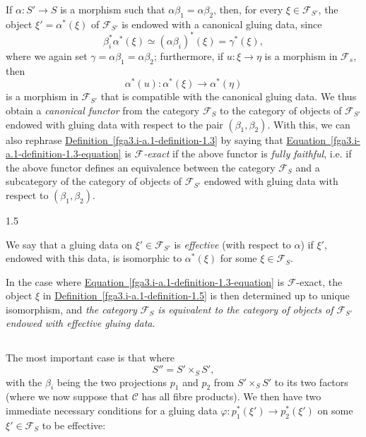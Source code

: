   If \(\alpha \colon  S'\to  S\) is a morphism such that \(\alpha \beta _1=\alpha \beta _2\), then, for every \(\xi \in \mathcal {F}_{S'}\), the object \(\xi '=\alpha ^*(\xi )\) of \(\mathcal {F}_{S'}\) is endowed with a canonical gluing data, since
  \[     \beta _i^*\alpha ^*(\xi )     \simeq  (\alpha \beta _i)^*(\xi )     = \gamma ^*(\xi ),   \]
  where we again set \(\gamma =\alpha \beta _1=\alpha \beta _2\);
  furthermore, if \(u\colon \xi \to \eta \) is a morphism in \(\mathcal {F}_s\), then
  \[     \alpha ^*(u)\colon  \alpha ^*(\xi ) \to  \alpha ^*(\eta )   \]
  is a morphism in \(\mathcal {F}_{S'}\) that is compatible with the canonical gluing data.
  We thus obtain a \emph{canonical functor} from the category \(\mathcal {F}_S\) to the category of objects of \(\mathcal {F}_{S'}\) endowed with gluing data with respect to the pair \((\beta _1,\beta _2)\).
  With this, we can also rephrase \hyperref[fga3.i-a.1-definition-1.3]{Definition~\ref*{fga3.i-a.1-definition-1.3}} by saying that \hyperref[fga3.i-a.1-definition-1.3-equation]{Equation~\ref*{fga3.i-a.1-definition-1.3-equation}} is \emph{\(\mathcal {F}\)-exact} if the above functor is \emph{fully faithful}, i.e. if the above functor defines an equivalence between the category \(\mathcal {F}_S\) and a subcategory of the category of objects of \(\mathcal {F}_{S'}\) endowed with gluing data with respect to \((\beta _1,\beta _2)\).\begin{definition}{1.5}\label{fga3.i-a.1-definition-1.5}\skipsinglepar\par{}We say that a gluing data on \(\xi '\in \mathcal {F}_{S'}\) is \emph{effective} (with respect to \(\alpha \)) if \(\xi '\), endowed with this data, is isomorphic to \(\alpha ^*(\xi )\) for some \(\xi \in \mathcal {F}_S\).\end{definition}\par{}In the case where \hyperref[fga3.i-a.1-definition-1.3-equation]{Equation~\ref*{fga3.i-a.1-definition-1.3-equation}} is \(\mathcal {F}\)-exact, the object \(\xi \) in \hyperref[fga3.i-a.1-definition-1.5]{Definition~\ref*{fga3.i-a.1-definition-1.5}} is then determined up to unique isomorphism, and \emph{the category \(\mathcal {F}_S\) is equivalent to the category of objects of \(\mathcal {F}_{S'}\) endowed with effective gluing data}.\subsection{}\label{fga3.i-a.1.c}\par{}The most important case is that where
  \[     S'' = S' \times _S S',   \]
  with the \(\beta _i\) being the two projections \(p_1\) and \(p_2\) from \(S'\times _S S'\) to its two factors (where we now suppose that \(\mathcal {C}\) has all fibre products).
  We then have two immediate necessary conditions for a gluing data \(\varphi \colon  p_1^*(\xi ')\to  p_2^*(\xi ')\) on some \(\xi '\in \mathcal {F}_S\) to be effective:

